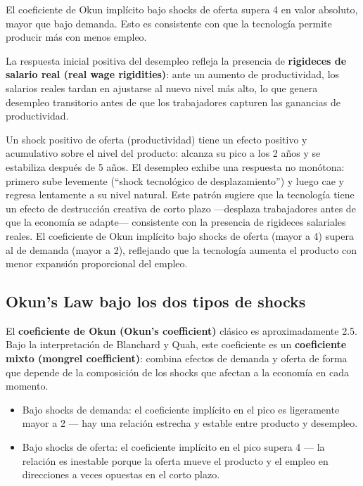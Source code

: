 \documentclass[12pt]{article}
\begin{document}
El coeficiente de Okun impl\'icito bajo shocks de oferta supera 4 en valor absoluto, mayor que bajo demanda. Esto es consistente con que la tecnolog\'ia permite producir m\'as con menos empleo.

La respuesta inicial positiva del desempleo refleja la presencia de \textbf{rigideces de salario real (real wage rigidities)}: ante un aumento de productividad, los salarios reales tardan en ajustarse al nuevo nivel m\'as alto, lo que genera desempleo transitorio antes de que los trabajadores capturen las ganancias de productividad.

\begin{hallazgo}
Un shock positivo de oferta (productividad) tiene un efecto positivo y acumulativo sobre el nivel del producto: alcanza su pico a los 2 a\~nos y se estabiliza despu\'es de 5 a\~nos. El desempleo exhibe una respuesta no mon\'otona: primero sube levemente (``shock tecnol\'ogico de desplazamiento'') y luego cae y regresa lentamente a su nivel natural. Este patr\'on sugiere que la tecnolog\'ia tiene un efecto de destrucci\'on creativa de corto plazo ---desplaza trabajadores antes de que la econom\'ia se adapte--- consistente con la presencia de rigideces salariales reales. El coeficiente de Okun impl\'icito bajo shocks de oferta (mayor a 4) supera al de demanda (mayor a 2), reflejando que la tecnolog\'ia aumenta el producto con menor expansi\'on proporcional del empleo.
\end{hallazgo}

\subsection{Okun's Law bajo los dos tipos de shocks}

El \textbf{coeficiente de Okun (Okun's coefficient)} cl\'asico es aproximadamente 2.5. Bajo la interpretaci\'on de Blanchard y Quah, este coeficiente es un \textbf{coeficiente mixto (mongrel coefficient)}: combina efectos de demanda y oferta de forma que depende de la composici\'on de los shocks que afectan a la econom\'ia en cada momento.
\begin{itemize}
  \item Bajo shocks de demanda: el coeficiente impl\'icito en el pico es ligeramente mayor a 2 --- hay una relaci\'on estrecha y estable entre producto y desempleo.
  \item Bajo shocks de oferta: el coeficiente impl\'icito en el pico supera 4 --- la relaci\'on es inestable porque la oferta mueve el producto y el empleo en direcciones a veces opuestas en el corto plazo.
\end{itemize}
\end{document}
